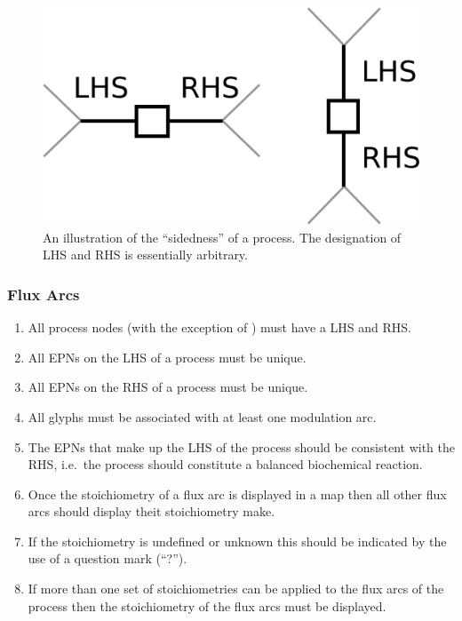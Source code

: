 \begin{figure}[H]
  \centering
  \includegraphics[scale = 0.4]{images/process_sidedness}
  \caption{An illustration of the ``sidedness'' of a process. The designation of LHS and RHS is essentially arbitrary.}
  \label{fig:process-sidedness}
\end{figure}

\subsubsection{Flux Arcs}

\begin{enumerate}
\item All process nodes (with the exception of ) must have a LHS and RHS.
    \item All EPNs on the LHS of a process must be unique.
    \item All EPNs on the RHS of a process must be unique.
    \item All  glyphs must be associated with at least one modulation arc.
    \item The EPNs that make up the LHS of the process should be consistent with the RHS, i.e.\, the process should constitute a    balanced biochemical reaction.
    \item Once the stoichiometry of a flux arc is displayed in a map then all other flux arcs should
    display theit stoichiometry make.
    \item If the stoichiometry is undefined or unknown this should be indicated by the use of a question mark (``?''). 
   \item If more than one set of stoichiometries can be applied to the flux arcs of the process then the stoichiometry of the flux arcs must be displayed.
\end{enumerate}  

